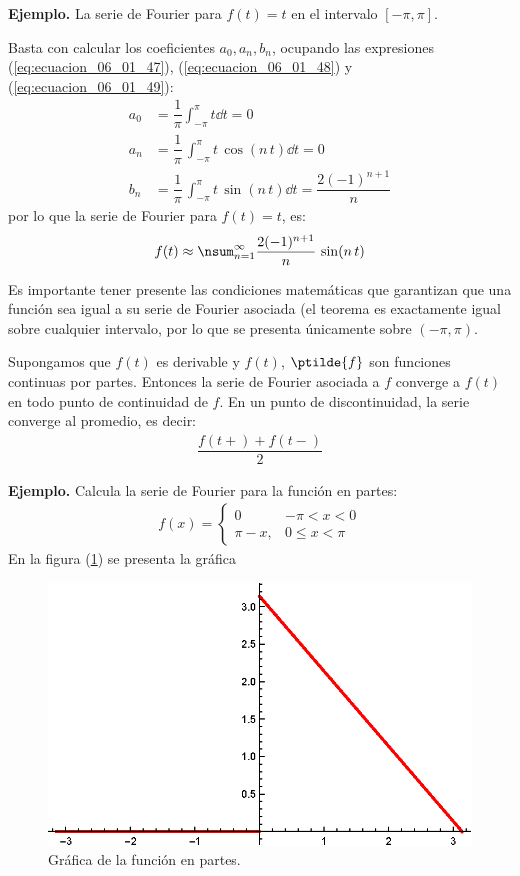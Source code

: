 \textbf{Ejemplo. } La serie de Fourier para $f(t) = t$ en el intervalo $[-\pi, \pi]$.

Basta con calcular los coeficientes $a_{0}, a_{n}, b_{n}$, ocupando las expresiones (\ref{eq:ecuacion_06_01_47}), (\ref{eq:ecuacion_06_01_48}) y (\ref{eq:ecuacion_06_01_49}):
\begin{align*}
a_{0} &= \dfrac{1}{\pi} \int_{-\pi}^{\pi} t \dd{t} = 0 \\[0.5em]
a_{n} &= \dfrac{1}{\pi} \, \int_{-\pi}^{\pi} t \, \cos (n \, t) \dd{t} = 0 \\[0.5em]
b_{n} &= \dfrac{1}{\pi} \, \int_{-\pi}^{\pi} t \, \sin (n \, t) \dd{t} = \dfrac{2(-1)^{n+1}}{n}
\end{align*}
por lo que la serie de Fourier para $f(t) = t$, es:
\begin{align*}
f(t) \approx \nsum_{n=1}^{\infty} \dfrac{2(-1)^{n+1}}{n} \, \sin (n \, t)
\end{align*}

Es importante tener presente las condiciones matemáticas que garantizan que una función sea igual a su serie de Fourier asociada (el teorema es exactamente igual sobre cualquier intervalo, por lo que se presenta únicamente sobre $(-\pi, \pi)$.
\par
Supongamos que $f(t)$ es derivable y $f(t)$, $\ptilde{f}$  son funciones continuas por partes. Entonces la serie de Fourier asociada a $f$ converge a $f(t)$ en todo punto de continuidad de $f$. En un punto de discontinuidad, la serie converge al promedio, es decir:
\begin{align}
\dfrac{f(t+) + f(t-)}{2}
\label{eq:ecuacion_06_01_55}
\end{align}

\textbf{Ejemplo. } Calcula la serie de Fourier para la función en partes:
\begin{align*}
f(x) = \begin{cases}
0 & -\pi < x < 0 \\
\pi - x, & 0 \leq x < \pi
\end{cases}
\end{align*}
En la figura (\ref{fig:06_01_03}) se presenta la gráfica
\begin{figure}[H]
    \centering
    \includegraphics[scale=1]{Imagenes/Funciones_Ortogonales_03.eps}
    \caption{Gráfica de la función en partes.}
    \label{fig:06_01_03}
\end{figure}

